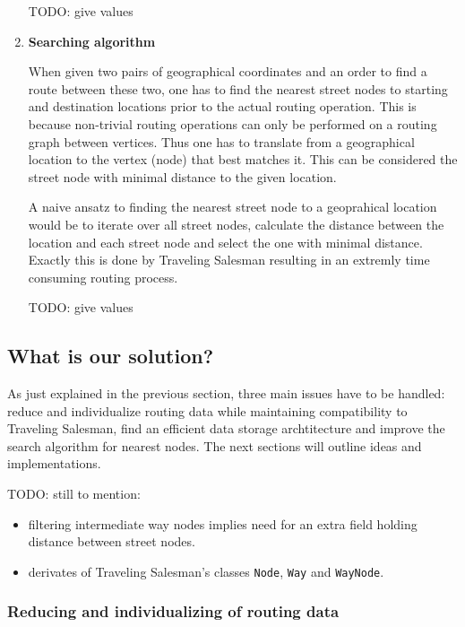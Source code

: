\begin{enumerate}
		TODO: give values
											
	\item \textbf{Searching algorithm}
	
		When given two pairs of geographical coordinates and an order to find a route between these two, one has to find the nearest street nodes to starting and destination locations prior to the actual routing operation. This is because non-trivial routing operations can only be performed on a routing graph between vertices. Thus one has to translate from a geographical location to the vertex (node) that best matches it. This can be considered the street node with minimal distance to the given location.\newline
				
		A naive ansatz to finding the nearest street node 	to a geoprahical location would be to iterate over all street nodes, calculate the distance between the location and each street node and select the one with minimal distance. Exactly this is done by Traveling Salesman resulting in an extremly time consuming routing process.\newline
		
		TODO: give values

\end{enumerate}


\subsection{What is our solution?}

As just explained in the previous section, three main issues have to be handled: reduce and individualize routing data while maintaining compatibility to Traveling Salesman, find an efficient data storage archtitecture and improve the search algorithm for nearest nodes. The next sections will outline ideas and implementations. \newline

TODO: still to mention:
\begin{itemize}
	\item filtering intermediate way nodes implies need for an extra field holding distance between street nodes.
	\item derivates of Traveling Salesman's classes \texttt{Node}, \texttt{Way} and \texttt{WayNode}.
\end{itemize}

\subsubsection{Reducing and individualizing of routing data}

